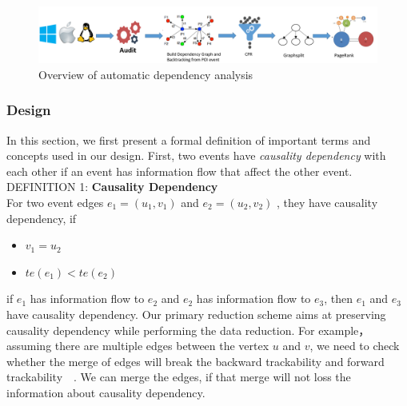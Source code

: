 


\begin{figure}[!htp]
	\centering
	
	\includegraphics[width=\textwidth]{figflow2.png}
	\caption{Overview of automatic dependency analysis}
	\label{fig:steps}
\end{figure}


\subsubsection{Design}
In this section,  we first present a formal definition of important terms and concepts used in our design.
First, two events have \textit{causality dependency} with each other if an event has information flow that affect the other event.\\
DEFINITION 1: \textbf{Causality Dependency} \\
\indent For two event edges $e_1 = \mathit{(u_1, v_1)} $ and $e_2 = \mathit{(u_2, v_2)} $ , they have causality dependency, if
\begin{itemize}[noitemsep]
	\item $v_1 = u_2 $
	\item $te\mathit{(e_1)} < te\mathit{(e_2)}$
\end{itemize}
if $e_1$ has information flow to $e_2$ and $e_2$  has information flow to $e_3$, then $e_1$ and $e_3$ have causality dependency.
Our primary reduction scheme aims at preserving causality dependency while performing the data reduction. For example， assuming there are multiple edges between the vertex $u$ and $v$, we need to check whether the merge of edges will break the backward trackability and forward trackability~~\cite{xu2016high}.
We can merge the edges, if that merge will not loss the information about causality dependency.

